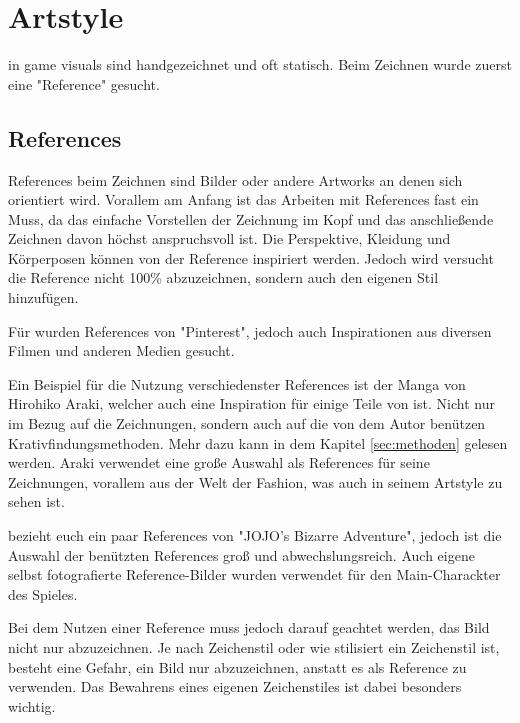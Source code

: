 \section{Artstyle}\label{sec:artstyle}

\renewcommand{\kapitelautor}{Autor: Philip Jankovic}

\FF in game visuals sind handgezeichnet und oft statisch. Beim Zeichnen wurde zuerst eine "Reference" gesucht.


\subsection{References}\label{subsec:references}
References beim Zeichnen sind Bilder oder andere Artworks an denen sich orientiert wird. Vorallem am Anfang ist das
Arbeiten mit References fast ein Muss, da das einfache Vorstellen der Zeichnung im Kopf und das anschließende Zeichnen davon höchst anspruchsvoll ist.
Die Perspektive, Kleidung und Körperposen können von der Reference inspiriert werden.
Jedoch wird versucht die Reference nicht 100\% abzuzeichnen, sondern auch den eigenen Stil hinzufügen. 


Für \FF wurden References von "Pinterest", jedoch auch Inspirationen aus diversen Filmen und anderen Medien gesucht. 


Ein Beispiel für die Nutzung verschiedenster References ist der Manga  von Hirohiko Araki,
welcher auch eine Inspiration für einige Teile von \FF ist. Nicht nur im Bezug auf die Zeichnungen, sondern auch auf die von dem Autor benützen Krativfindungsmethoden.
Mehr dazu kann in dem Kapitel \ref{sec:methoden} gelesen werden.
Araki verwendet eine große Auswahl als References für seine Zeichnungen, vorallem aus der Welt
der Fashion, was auch in seinem Artstyle zu sehen ist.


\FF bezieht euch ein paar References von "JOJO's Bizarre Adventure", jedoch ist die Auswahl der benützten References groß und abwechslungsreich.
Auch eigene selbst fotografierte Reference-Bilder wurden verwendet für \zB den Main-Charackter des Spieles.



Bei dem Nutzen einer Reference muss jedoch darauf geachtet werden, das Bild nicht nur abzuzeichnen. Je nach Zeichenstil
oder wie stilisiert ein Zeichenstil ist, besteht eine Gefahr, ein Bild nur abzuzeichnen, anstatt es als Reference zu verwenden.
Das Bewahrens eines eigenen Zeichenstiles ist dabei besonders wichtig.


